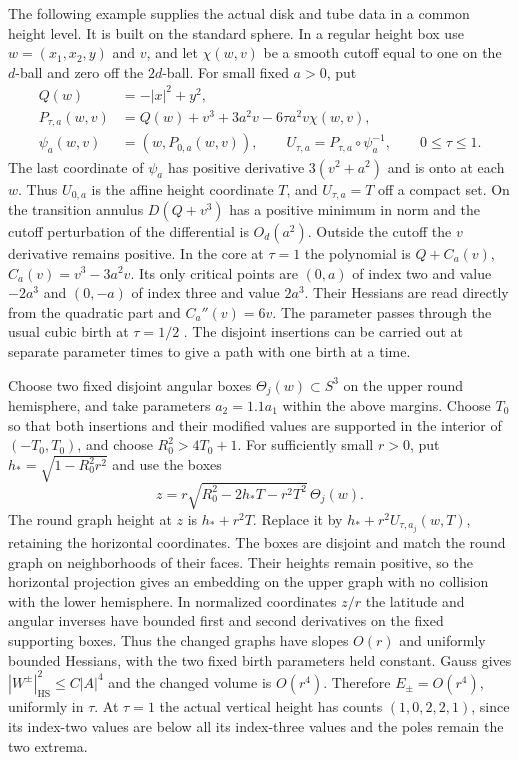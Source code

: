\documentclass[11pt,letterpaper]{article}
\numberwithin{equation}{section}
\begin{document}
The following example supplies the actual disk and tube data in
a common height level. It is built on the standard sphere.
In a regular height box use \(w=(x_1,x_2,y)\) and \(v\), and let
\(\chi(w,v)\) be a smooth cutoff equal to one on the \(d\)-ball
and zero off the \(2d\)-ball. For small fixed \(a>0\), put
\[
 \begin{aligned}
 Q(w)&=-|x|^2+y^2,\\
 P_{\tau,a}(w,v)&=Q(w)+v^3+3a^2v-6\tau a^2v\chi(w,v),\\
 \psi_a(w,v)&=(w,P_{0,a}(w,v)),\qquad
 U_{\tau,a}=P_{\tau,a}\circ\psi_a^{-1},\qquad 0\le\tau\le1 .
 \end{aligned}
\]
The last coordinate of \(\psi_a\) has positive derivative
\(3(v^2+a^2)\) and is onto at each \(w\). Thus \(U_{0,a}\) is the
affine height coordinate \(T\), and \(U_{\tau,a}=T\) off a
compact set. On the transition annulus \(D(Q+v^3)\) has a
positive minimum in norm and the cutoff perturbation of the
differential is \(O_d(a^2)\). Outside the cutoff the \(v\)
derivative remains positive. In the core at \(\tau=1\) the
polynomial is \(Q+C_a(v)\), \(C_a(v)=v^3-3a^2v\).
Its only critical points are \((0,a)\) of index two and value
\(-2a^3\) and \((0,-a)\) of index three and value \(2a^3\).
Their Hessians are read directly from the quadratic part and
\(C_a''(v)=6v\). The parameter passes through the usual cubic
birth at \(\tau=1/2\)
\cite[\S3.5, equation (3.5.1)]{BorodzikPowellTeichner2025LinkConcordance}.
The disjoint insertions can be carried out at separate parameter
times to give a path with one birth at a time.

Choose two fixed disjoint angular boxes
\(\Theta_j(w)\subset S^3\) on the upper round hemisphere, and take
parameters \(a_2=1.1a_1\) within the above margins. Choose \(T_0\)
so that both insertions and their modified values are supported
in the interior of \((-T_0,T_0)\), and choose \(R_0^2>4T_0+1\).
For sufficiently small \(r>0\), put \(h_*=\sqrt{1-R_0^2r^2}\)
and use the boxes
\[
 z=r\sqrt{R_0^2-2h_*T-r^2T^2}\,\Theta_j(w).
\]
The round graph height at \(z\) is \(h_*+r^2T\). Replace it by
\(h_*+r^2U_{\tau,a_j}(w,T)\), retaining the horizontal coordinates.
The boxes are disjoint and match the round graph on neighborhoods
of their faces. Their heights remain positive, so the horizontal
projection gives an embedding on the upper graph with no collision
with the lower hemisphere. In normalized coordinates \(z/r\)
the latitude and angular inverses have bounded first and second
derivatives on the fixed supporting boxes. Thus the changed graphs
have slopes \(O(r)\) and uniformly bounded Hessians, with the
two fixed birth parameters held constant. Gauss gives
\(|W^\pm|_{\mathrm{HS}}^2\le C|A|^4\) and the changed volume
is \(O(r^4)\). Therefore \(E_\pm=O(r^4)\), uniformly in \(\tau\).
At \(\tau=1\) the actual vertical height has counts
\((1,0,2,2,1)\), since its index-two values are below all its
index-three values and the poles remain the two extrema.
\end{document}
